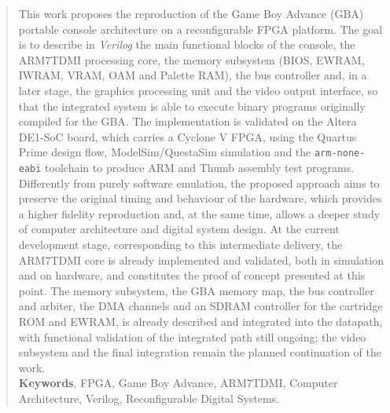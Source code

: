 \documentclass[pnumromarab,times]{politex}
\begin{document}
\begin{abstract}
This work proposes the reproduction of the Game Boy Advance (GBA)
portable console architecture on a reconfigurable FPGA platform. The
goal is to describe in \emph{Verilog} the main functional blocks of
the console, the ARM7TDMI processing core, the memory subsystem
(BIOS, EWRAM, IWRAM, VRAM, OAM and Palette RAM), the bus controller
and, in a later stage, the graphics processing unit and the video
output interface, so that the integrated system is able to execute
binary programs originally compiled for the GBA. The implementation
is validated on the Altera DE1-SoC board, which carries a Cyclone V
FPGA, using the Quartus Prime design flow, ModelSim/QuestaSim
simulation and the \texttt{arm-none-eabi} toolchain to produce ARM
and Thumb assembly test programs. Differently from purely software
emulation, the proposed approach aims to preserve the original
timing and behaviour of the hardware, which provides a higher
fidelity reproduction and, at the same time, allows a deeper study
of computer architecture and digital system design. At the current
development stage, corresponding to this intermediate delivery, the
ARM7TDMI core is already implemented and validated, both in
simulation and on hardware, and constitutes the proof of concept
presented at this point. The memory subsystem, the GBA memory map,
the bus controller and arbiter, the DMA channels and an SDRAM controller
for the cartridge ROM and EWRAM, is already described and integrated into the
datapath, with functional validation of the integrated path still
ongoing; the video subsystem and the final integration remain the
planned continuation of the work.
%
\\[3\baselineskip]
%
\textbf{Keywords}, FPGA, Game Boy Advance, ARM7TDMI, Computer
Architecture, Verilog, Reconfigurable Digital Systems.
\end{abstract}


\listadefiguras
\end{document}
